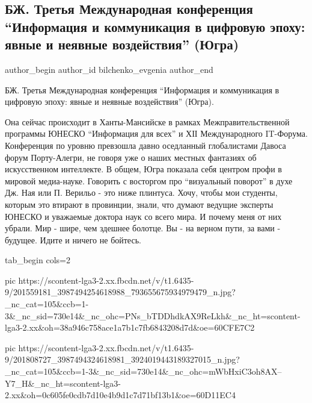  
 
 
 
 
 
\subsection{БЖ. Третья Международная конференция \enquote{Информация и коммуникация в цифровую эпоху: явные и неявные воздействия} (Югра)}
\label{sec:17_06_2021.fb.bilchenko_evgenia.3.konferencia}
\ifcmt
 author_begin
   author_id bilchenko_evgenia
 author_end
\fi

БЖ. Третья Международная конференция \enquote{Информация и коммуникация в цифровую
эпоху: явные и неявные воздействия} (Югра).

Она сейчас происходит в Ханты-Мансийске в рамках Межправительственной программы
ЮНЕСКО \enquote{Информация для всех} и ХІІ  Международного IT-Форума. Конференция по
уровню превзошла давно оседланный глобалистами Давоса форум Порту-Алегри, не
говоря уже о наших местных фантазиях об искусственном интеллекте. В общем, Югра
показала себя центром профи в мировой медиа-науке. Говорить с восторгом про
\enquote{визуальный поворот} в духе Дж. Ная или П. Верильо - это ниже плинтуса. Хочу,
чтобы мои студенты, которым это втирают в провинции, знали, что думают ведущие
эксперты ЮНЕСКО и уважаемые доктора наук со всего мира. И почему меня от них
убрали. Мир - шире, чем здешнее болотце. Вы - на верном пути, за вами -
будущее. Идите и ничего не бойтесь. 


\ifcmt
  tab_begin cols=2

     pic https://scontent-lga3-2.xx.fbcdn.net/v/t1.6435-9/201559181_3987494254618988_793655675934979479_n.jpg?_nc_cat=105&ccb=1-3&_nc_sid=730e14&_nc_ohc=PNs_bTDDhdkAX9ReLkh&_nc_ht=scontent-lga3-2.xx&oh=38a946c758ace1a7b1c7fb6843208d7d&oe=60CFE7C2

     pic https://scontent-lga3-2.xx.fbcdn.net/v/t1.6435-9/201808727_3987494324618981_3924019443189327015_n.jpg?_nc_cat=105&ccb=1-3&_nc_sid=730e14&_nc_ohc=mWbHxiC3oh8AX--Y7_H&_nc_ht=scontent-lga3-2.xx&oh=0c605fe0cdb7d10e4b9d1c7d71bf13b1&oe=60D11EC4

